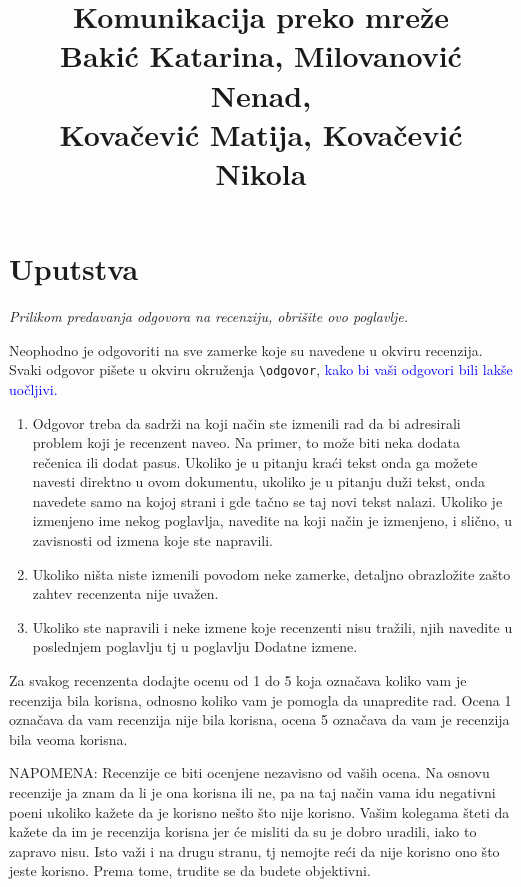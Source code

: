 \documentclass[a4paper]{report}
\newcommand{\odgovor}[1]{\textcolor{blue}{#1}}
\begin{document}
\title{Komunikacija preko mreže\\ \small{Bakić Katarina, Milovanović Nenad, \\Kovačević Matija, Kovačević Nikola}}

\maketitle

\tableofcontents

\chapter{Uputstva}
\emph{Prilikom predavanja odgovora na recenziju, obrišite ovo poglavlje.}

Neophodno je odgovoriti na sve zamerke koje su navedene u okviru recenzija. Svaki odgovor pišete u okviru okruženja \verb"\odgovor", \odgovor{kako bi vaši odgovori bili lakše uočljivi.} 
\begin{enumerate}

\item Odgovor treba da sadrži na koji način ste izmenili rad da bi adresirali problem koji je recenzent naveo. Na primer, to može biti neka dodata rečenica ili dodat pasus. Ukoliko je u pitanju kraći tekst onda ga možete navesti direktno u ovom dokumentu, ukoliko je u pitanju duži tekst, onda navedete samo na kojoj strani i gde tačno se taj novi tekst nalazi. Ukoliko je izmenjeno ime nekog poglavlja, navedite na koji način je izmenjeno, i slično, u zavisnosti od izmena koje ste napravili. 

\item Ukoliko ništa niste izmenili povodom neke zamerke, detaljno obrazložite zašto zahtev recenzenta nije uvažen.

\item Ukoliko ste napravili i neke izmene koje recenzenti nisu tražili, njih navedite u poslednjem poglavlju tj u poglavlju Dodatne izmene.
\end{enumerate}

Za svakog recenzenta dodajte ocenu od 1 do 5 koja označava koliko vam je recenzija bila korisna, odnosno koliko vam je pomogla da unapredite rad. Ocena 1 označava da vam recenzija nije bila korisna, ocena 5 označava da vam je recenzija bila veoma korisna. 

NAPOMENA: Recenzije ce biti ocenjene nezavisno od vaših ocena. Na osnovu recenzije ja znam da li je ona korisna ili ne, pa na taj način vama idu negativni poeni ukoliko kažete da je korisno nešto što nije korisno. Vašim kolegama šteti da kažete da im je recenzija korisna jer će misliti da su je dobro uradili, iako to zapravo nisu. Isto važi i na drugu stranu, tj nemojte reći da nije korisno ono što jeste korisno. Prema tome, trudite se da budete objektivni. 
\end{document}
